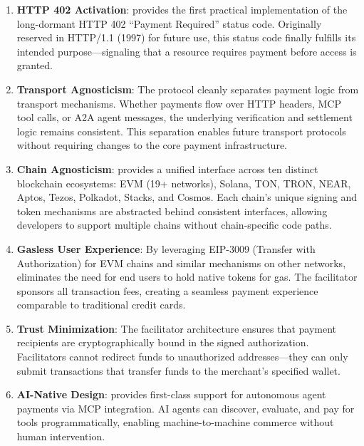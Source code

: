 \begin{enumerate}
    \item \textbf{HTTP 402 Activation}: \tprotocol{} provides the first practical implementation of the long-dormant HTTP 402 ``Payment Required'' status code. Originally reserved in HTTP/1.1 (1997) for future use, this status code finally fulfills its intended purpose---signaling that a resource requires payment before access is granted.

    \item \textbf{Transport Agnosticism}: The protocol cleanly separates payment logic from transport mechanisms. Whether payments flow over HTTP headers, MCP tool calls, or A2A agent messages, the underlying verification and settlement logic remains consistent. This separation enables future transport protocols without requiring changes to the core payment infrastructure.

    \item \textbf{Chain Agnosticism}: \tprotocol{} provides a unified interface across ten distinct blockchain ecosystems: EVM (19+ networks), Solana, TON, TRON, NEAR, Aptos, Tezos, Polkadot, Stacks, and Cosmos. Each chain's unique signing and token mechanisms are abstracted behind consistent interfaces, allowing developers to support multiple chains without chain-specific code paths.

    \item \textbf{Gasless User Experience}: By leveraging EIP-3009 (Transfer with Authorization) for EVM chains and similar mechanisms on other networks, \tprotocol{} eliminates the need for end users to hold native tokens for gas. The facilitator sponsors all transaction fees, creating a seamless payment experience comparable to traditional credit cards.

    \item \textbf{Trust Minimization}: The facilitator architecture ensures that payment recipients are cryptographically bound in the signed authorization. Facilitators cannot redirect funds to unauthorized addresses---they can only submit transactions that transfer funds to the merchant's specified wallet.

    \item \textbf{AI-Native Design}: \tprotocol{} provides first-class support for autonomous agent payments via MCP integration. AI agents can discover, evaluate, and pay for tools programmatically, enabling machine-to-machine commerce without human intervention.
\end{enumerate}

